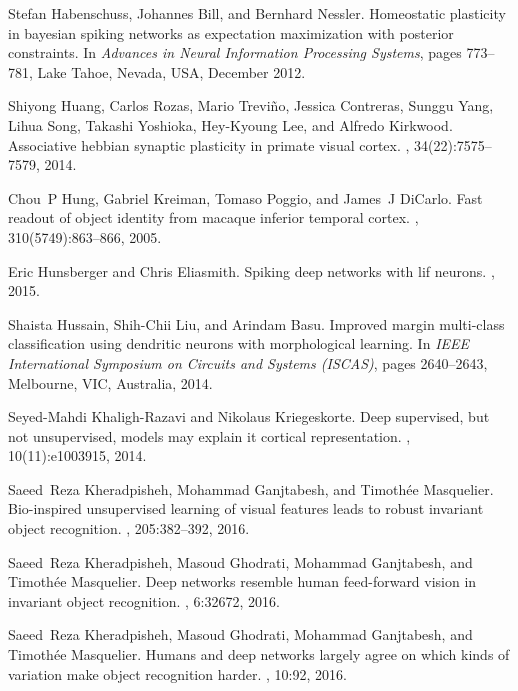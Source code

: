 \documentclass[preprint,5p,12pt,twocolumn]{article}
\begin{document}
\begin{thebibliography}{10}
Stefan Habenschuss, Johannes Bill, and Bernhard Nessler.
\newblock Homeostatic plasticity in bayesian spiking networks as expectation
  maximization with posterior constraints.
\newblock In {\em Advances in Neural Information Processing Systems}, pages
  773--781, Lake Tahoe, Nevada, USA, December 2012.

Shiyong Huang, Carlos Rozas, Mario Trevi{\~n}o, Jessica Contreras, Sunggu Yang,
  Lihua Song, Takashi Yoshioka, Hey-Kyoung Lee, and Alfredo Kirkwood.
\newblock Associative hebbian synaptic plasticity in primate visual cortex.
, 34(22):7575--7579, 2014.

Chou~P Hung, Gabriel Kreiman, Tomaso Poggio, and James~J DiCarlo.
\newblock Fast readout of object identity from macaque inferior temporal
  cortex.
, 310(5749):863--866, 2005.

Eric Hunsberger and Chris Eliasmith.
\newblock Spiking deep networks with lif neurons.
, 2015.

Shaista Hussain, Shih-Chii Liu, and Arindam Basu.
\newblock Improved margin multi-class classification using dendritic neurons
  with morphological learning.
\newblock In {\em IEEE International Symposium on Circuits and Systems
  (ISCAS)}, pages 2640--2643, Melbourne, VIC, Australia, 2014.

Seyed-Mahdi Khaligh-Razavi and Nikolaus Kriegeskorte.
\newblock Deep supervised, but not unsupervised, models may explain it cortical
  representation.
, 10(11):e1003915, 2014.

Saeed~Reza Kheradpisheh, Mohammad Ganjtabesh, and Timoth{\'e}e Masquelier.
\newblock Bio-inspired unsupervised learning of visual features leads to robust
  invariant object recognition.
, 205:382--392, 2016.

Saeed~Reza Kheradpisheh, Masoud Ghodrati, Mohammad Ganjtabesh, and Timoth{\'e}e
  Masquelier.
\newblock Deep networks resemble human feed-forward vision in invariant object
  recognition.
, 6:32672, 2016.

Saeed~Reza Kheradpisheh, Masoud Ghodrati, Mohammad Ganjtabesh, and Timoth{\'e}e
  Masquelier.
\newblock Humans and deep networks largely agree on which kinds of variation
  make object recognition harder.
, 10:92, 2016.


\end{thebibliography}
\end{document}
